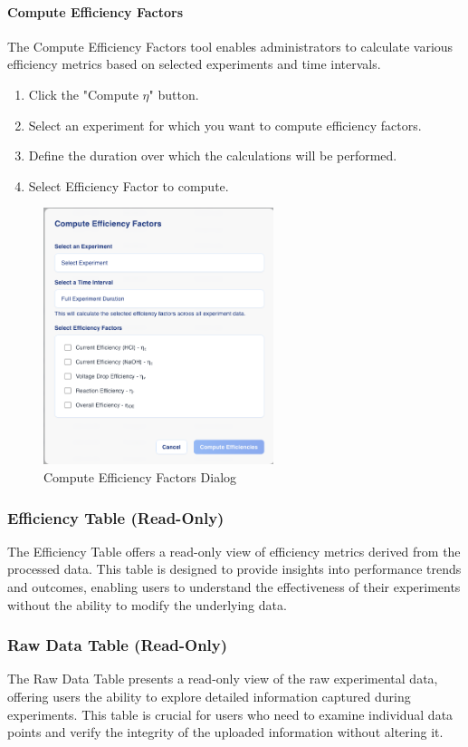 \documentclass[12pt]{article}
\begin{document}
\paragraph{Compute Efficiency Factors}
The Compute Efficiency Factors tool enables administrators to calculate various
efficiency metrics based on selected experiments and time intervals.
\begin{enumerate}
    \item Click the "Compute $\eta$" button.
    \item Select an experiment for which you want to compute efficiency factors.
    \item Define the duration over which the calculations will be performed.
    \item Select Efficiency Factor to compute.
\end{enumerate}

\begin{figure}[H]
    \centering
    \includegraphics[width=0.6\textwidth]{./Diagrams/ComputeEffFactors.png}
    \caption{Compute Efficiency Factors Dialog}
\end{figure}

\subsubsection{Efficiency Table (Read-Only)}
The Efficiency Table offers a read-only view of efficiency metrics derived from
the processed data. This table is designed to provide insights into performance
trends and outcomes, enabling users to understand the effectiveness of their
experiments without the ability to modify the underlying data.

\subsubsection{Raw Data Table (Read-Only)}
The Raw Data Table presents a read-only view of the raw experimental data,
offering users the ability to explore detailed information captured during
experiments. This table is crucial for users who need to examine individual data
points and verify the integrity of the uploaded information without altering it.
\end{document}
